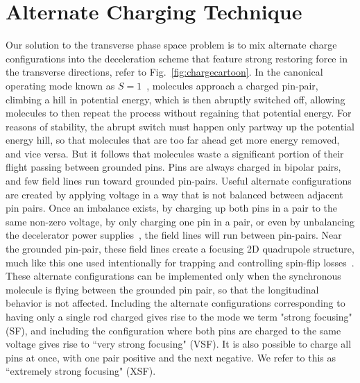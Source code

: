 \documentclass[%
 reprint,
 amsmath,amssymb,
 aps,
prl,
]{revtex4-1}
\begin{document}
\section{Alternate Charging Technique}
Our solution to the transverse phase space problem is to mix alternate charge configurations into the deceleration scheme that feature strong restoring force in the transverse directions, refer to Fig.~\ref{fig:chargecartoon}.
In the canonical operating mode known as $S=1$~\cite{VanDeMeerakker2012}, molecules approach a charged pin-pair, climbing a hill in potential energy, which is then abruptly switched off, allowing molecules to then repeat the process without regaining that potential energy. 
For reasons of stability, the abrupt switch must happen only partway up the potential energy hill, so that molecules that are too far ahead get more energy removed, and vice versa. But it follows that molecules waste a significant portion of their flight passing between grounded pins.
Pins are always charged in bipolar pairs, and few field lines run toward grounded pin-pairs. 
Useful alternate configurations are created by applying voltage in a way that is not balanced between adjacent pin pairs. 
Once an imbalance exists, by charging up both pins in a pair to the same non-zero voltage, by only charging one pin in a pair, or even by unbalancing the decelerator power supplies~\cite{Hoekstra2018}, the field lines will run between pin-pairs. 
Near the grounded pin-pair, these field lines create a focusing 2D quadrupole structure, much like this one used intentionally for trapping and controlling spin-flip losses~\cite{Reens2017}. 
These alternate configurations can be implemented only when the synchronous molecule is flying between the grounded pin pair, so that the longitudinal behavior is not affected.
Including the alternate configurations corresponding to having only a single rod charged gives rise to the mode we term "strong focusing" (SF), and including the configuration where both pins are charged to the same voltage gives rise to ``very strong focusing" (VSF). It is also possible to charge all pins at once, with one pair positive and the next negative. We refer to this as ``extremely strong focusing" (XSF).
\end{document}
